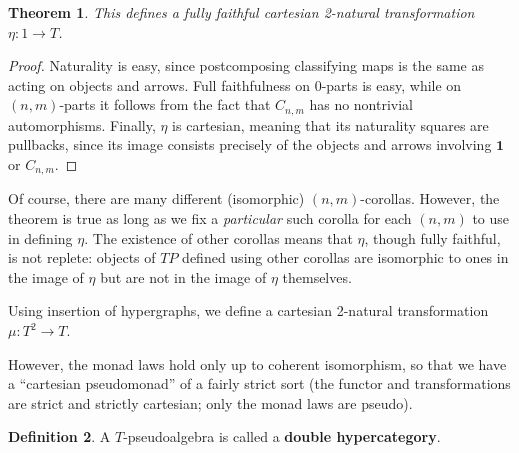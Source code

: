 \documentclass{article}
\newtheorem{thm}{Theorem}[section]
\theoremstyle{definition}
\newtheorem{defn}[thm]{Definition}
\theoremstyle{remark}
\begin{document}
\begin{thm}
  This defines a fully faithful cartesian 2-natural transformation $\eta: 1\to T$.
\end{thm}
\begin{proof}
  Naturality is easy, since postcomposing classifying maps is the same as acting on objects and arrows.
  Full faithfulness on $0$-parts is easy, while on $(n,m)$-parts it follows from the fact that $C_{n,m}$ has no nontrivial automorphisms.
  Finally, $\eta$ is cartesian, meaning that its naturality squares are pullbacks, since its image consists precisely of the objects and arrows involving $\mathbf{1}$ or $C_{n,m}$.
\end{proof}

Of course, there are many different (isomorphic) $(n,m)$-corollas.
However, the theorem is true as long as we fix a \emph{particular} such corolla for each $(n,m)$ to use in defining $\eta$.
The existence of other corollas means that $\eta$, though fully faithful, is not replete: objects of $TP$ defined using other corollas are isomorphic to ones in the image of $\eta$ but are not in the image of $\eta$ themselves.

Using insertion of hypergraphs, we define a cartesian 2-natural transformation $\mu:T^2\to T$.

However, the monad laws hold only up to coherent isomorphism, so that we have a ``cartesian pseudomonad'' of a fairly strict sort (the functor and transformations are strict and strictly cartesian; only the monad laws are pseudo).

\begin{defn}
  A $T$-pseudoalgebra is called a \textbf{double hypercategory}.
\end{defn}
\end{document}
